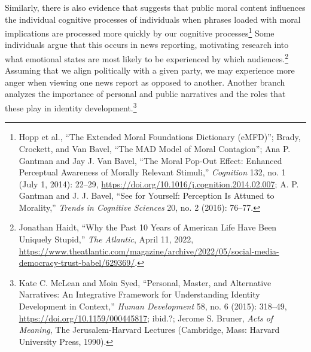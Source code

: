 \documentclass[phdthesis,12pt,final,a4paper]{wuthesis}
\theoremstyle{definition}
\theoremstyle{definition}
\theoremstyle{definition}
\theoremstyle{definition}
\theoremstyle{remark}
\begin{document}
Similarly, there is also evidence that suggests that public moral content influences the individual cognitive processes of individuals when phrases loaded with moral implications are processed more quickly by our cognitive processes\footnote{Hopp et al., {``The Extended {Moral Foundations Dictionary} ({eMFD})''}; Brady, Crockett, and Van Bavel, {``The {MAD} Model of Moral Contagion''}; Ana P. Gantman and Jay J. Van Bavel, {``The Moral Pop-Out Effect: {Enhanced} Perceptual Awareness of Morally Relevant Stimuli,''} \emph{Cognition} 132, no. 1 (July 1, 2014): 22--29, \url{https://doi.org/10.1016/j.cognition.2014.02.007}; A. P. Gantman and J. J. Bavel, {``See for Yourself: Perception Is Attuned to Morality,''} \emph{Trends in Cognitive Sciences} 20, no. 2 (2016): 76--77.} Some individuals argue that this occurs in news reporting, motivating research into what emotional states are most likely to be experienced by which audiences.\footnote{Jonathan Haidt, {``Why the {Past} 10 {Years} of {American Life Have Been Uniquely Stupid},''} \emph{The Atlantic}, April 11, 2022, \url{https://www.theatlantic.com/magazine/archive/2022/05/social-media-democracy-trust-babel/629369/}.} Assuming that we align politically with a given party, we may experience more anger when viewing one news report as opposed to another. Another branch analyzes the importance of personal and public narratives and the roles that these play in identity development.\footnote{Kate C. McLean and Moin Syed, {``Personal, {Master}, and {Alternative Narratives}: {An Integrative Framework} for {Understanding Identity Development} in {Context},''} \emph{Human Development} 58, no. 6 (2015): 318--49, \url{https://doi.org/10.1159/000445817}; ibid.?; Jerome S. Bruner, \emph{Acts of Meaning}, The {Jerusalem-Harvard} Lectures (Cambridge, Mass: Harvard University Press, 1990).}
\end{document}

